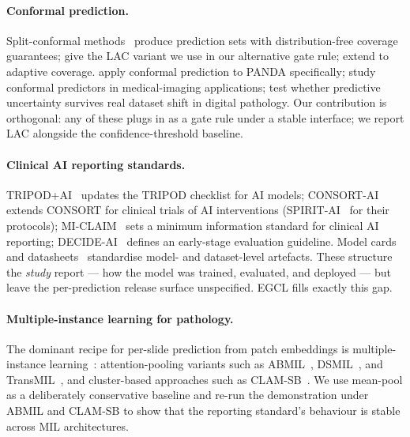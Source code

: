 \documentclass{article}
\begin{document}
\paragraph{Conformal prediction.} Split-conformal methods~\citep{vovk2005algorithmic,angelopoulos2021gentle} produce prediction sets with distribution-free coverage guarantees; \citet{sadinle2019least} give the LAC variant we use in our alternative gate rule; \citet{romano2020classification} extend to adaptive coverage. \citet{olsson2022estimating} apply conformal prediction to PANDA specifically; \citet{lu2021fairconformal} study conformal predictors in medical-imaging applications; \citet{thagaard2020trust} test whether predictive uncertainty survives real dataset shift in digital pathology. Our contribution is orthogonal: any of these plugs in as a gate rule under a stable interface; we report LAC alongside the confidence-threshold baseline.

\paragraph{Clinical AI reporting standards.} TRIPOD+AI~\citep{collins2024tripod} updates the TRIPOD checklist for AI models; CONSORT-AI~\citep{liu2020consort} extends CONSORT for clinical trials of AI interventions (SPIRIT-AI~\citep{cruzrivera2020spirit} for their protocols); MI-CLAIM~\citep{norgeot2020miclaim} sets a minimum information standard for clinical AI reporting; DECIDE-AI~\citep{vasey2022decide} defines an early-stage evaluation guideline. Model cards~\citep{mitchell2019modelcards} and datasheets~\citep{gebru2021datasheets} standardise model- and dataset-level artefacts. These structure the \emph{study} report --- how the model was trained, evaluated, and deployed --- but leave the per-prediction release surface unspecified. EGCL fills exactly this gap.

\paragraph{Multiple-instance learning for pathology.} The dominant recipe for per-slide prediction from patch embeddings is multiple-instance learning~\citep{campanella2019clinical}: attention-pooling variants such as ABMIL~\citep{ilse2018attention}, DSMIL~\citep{li2021dsmil}, and TransMIL~\citep{shao2021transmil}, and cluster-based approaches such as CLAM-SB~\citep{lu2021clam}. We use mean-pool as a deliberately conservative baseline and re-run the demonstration under ABMIL and CLAM-SB to show that the reporting standard's behaviour is stable across MIL architectures.
\end{document}
